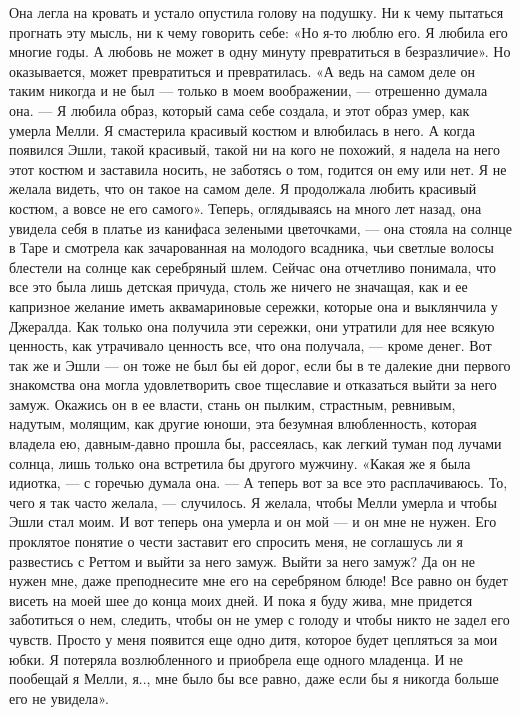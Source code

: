 Она легла на кровать и устало опустила голову на подушку. Ни к чему пытаться прогнать эту мысль, ни к чему говорить себе:
«Но я-то люблю его. Я любила его многие годы. А любовь не может в одну минуту превратиться в безразличие».
Но оказывается, может превратиться и превратилась.
«А ведь на самом деле он таким никогда и не был — только в моем воображении, — отрешенно думала она. — Я любила образ, который сама себе создала, и этот образ умер, как умерла Мелли. Я смастерила красивый костюм и влюбилась в него. А когда появился Эшли, такой красивый, такой ни на кого не похожий, я надела на него этот костюм и заставила носить, не заботясь о том, годится он ему или нет. Я не желала видеть, что он такое на самом деле. Я продолжала любить красивый костюм, а вовсе не его самого».
Теперь, оглядываясь на много лет назад, она увидела себя в платье из канифаса зелеными цветочками, — она стояла на солнце в Таре и смотрела как зачарованная на молодого всадника, чьи светлые волосы блестели на солнце как серебряный шлем. Сейчас она отчетливо понимала, что все это была лишь детская причуда, столь же ничего не значащая, как и ее капризное желание иметь аквамариновые сережки, которые она и выклянчила у Джералда. Как только она получила эти сережки, они утратили для нее всякую ценность, как утрачивало ценность все, что она получала, — кроме денег. Вот так же и Эшли — он тоже не был бы ей дорог, если бы в те далекие дни первого знакомства она могла удовлетворить свое тщеславие и отказаться выйти за него замуж. Окажись он в ее власти, стань он пылким, страстным, ревнивым, надутым, молящим, как другие юноши, эта безумная влюбленность, которая владела ею, давным-давно прошла бы, рассеялась, как легкий туман под лучами солнца, лишь только она встретила бы другого мужчину.
«Какая же я была идиотка, — с горечью думала она. — А теперь вот за все это расплачиваюсь. То, чего я так часто желала, — случилось. Я желала, чтобы Мелли умерла и чтобы Эшли стал моим. И вот теперь она умерла и он мой — и он мне не нужен. Его проклятое понятие о чести заставит его спросить меня, не соглашусь ли я развестись с Реттом и выйти за него замуж. Выйти за него замуж? Да он не нужен мне, даже преподнесите мне его на серебряном блюде! Все равно он будет висеть на моей шее до конца моих дней. И пока я буду жива, мне придется заботиться о нем, следить, чтобы он не умер с голоду и чтобы никто не задел его чувств. Просто у меня появится еще одно дитя, которое будет цепляться за мои юбки. Я потеряла возлюбленного и приобрела еще одного младенца. И не пообещай я Мелли, я.., мне было бы все равно, даже если бы я никогда больше его не увидела».

